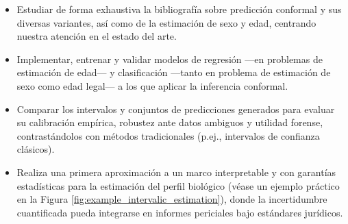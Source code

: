 \begin{itemize}

    \item Estudiar de forma exhaustiva la bibliografía sobre predicción conformal y sus diversas variantes, así como de la estimación de sexo y edad, centrando nuestra atención en el estado del arte.


    \item Implementar, entrenar y validar modelos de regresión ---en problemas de estimación de edad--- y clasificación ---tanto en problema de estimación de sexo como edad legal--- a los que aplicar la inferencia conformal.

    \item Comparar los intervalos y conjuntos de predicciones generados para evaluar su calibración empírica, robustez ante datos ambiguos y utilidad forense, contrastándolos con métodos tradicionales (p.ej., intervalos de confianza clásicos).  

    \item Realiza una primera aproximación a un marco interpretable y con garantías estadísticas para la estimación del perfil biológico (véase un ejemplo práctico en la Figura \ref{fig:example_intervalic_estimation}), donde la incertidumbre cuantificada pueda integrarse en informes periciales bajo estándares jurídicos.

\end{itemize}


